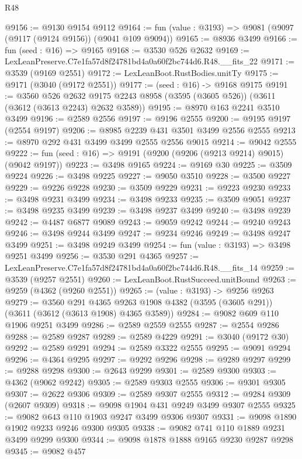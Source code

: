 \begin{lexlean}{R48}
\begin{coremodule}
@9156 := @9130 @9154 @9112
@9164 := fun (value : @3193) => @9081 (@9097 (@9117 (@9124 @9156)) (@9041 @109 @9094))
@9165 := @8936 @3499
@9166 := fun (seed : @16) => @9165
@9168 := @3530 @526 @2632
@9169 := LexLeanPreserve.C7e1fa57d8f24781bd4a0a60f2bc744d6.R48.__fits_22
@9171 := @3539 (@9169 @2551)
@9172 := LexLeanBoot.RustBodies.unitTy
@9175 := @9171 (@3040 (@9172 @2551))
@9177 := (seed : @16) -> @9168 @9175
@9191 := @3560
    @526
    @2632
    @9175
    @2243
    @8958
    (@3595 (@3605 @526))
    (@3611 (@3612 (@3613 @2243) @2632 @3589))
@9195 := @8970 @163 @2241 @3510 @3499
@9196 := @2589 @2556
@9197 := @9196 @2555
@9200 := @9195 @9197 (@2554 @9197)
@9206 := @8985 @2239 @431 @3501 @3499 @2556 @2555
@9213 := @8970 @292 @431 @3499 @3499 @2555 @2556 @9015
@9214 := @9042 @2555
@9222 := fun (seed : @16) => @9191 (@9200 (@9206 (@9213 @9214) @9015) (@9042 @9197))
@9223 := @3498 @9165
@9224 := @9169 @30
@9225 := @3509 @9224
@9226 := @3498 @9225
@9227 := @9050 @3510
@9228 := @3500 @9227
@9229 := @9226 @9228
@9230 := @3509 @9229
@9231 := @9223 @9230
@9233 := @3498 @9231 @3499
@9234 := @3498 @9233
@9235 := @3509 @9051
@9237 := @3498 @9235 @3499
@9239 := @3498 @9237 @3499
@9240 := @3498 @9239
@9242 := @4487 @6877 @9089
@9243 := @9059 @9242
@9244 := @9240 @9243
@9246 := @3498 @9244 @3499
@9247 := @9234 @9246
@9249 := @3498 @9247 @3499
@9251 := @3498 @9249 @3499
@9254 := fun (value : @3193) => @3498 @9251 @3499
@9256 := @3530 @291 @4365
@9257 := LexLeanPreserve.C7e1fa57d8f24781bd4a0a60f2bc744d6.R48.__fits_14
@9259 := @3539 (@9257 @2551)
@9260 := LexLeanBoot.RustSucceed.unitBound
@9263 := @9259 (@4362 (@9260 @2551))
@9265 := (value : @3193) -> @9256 @9263
@9279 := @3560
    @291
    @4365
    @9263
    @1908
    @4382
    (@3595 (@3605 @291))
    (@3611 (@3612 (@3613 @1908) @4365 @3589))
@9284 := @9082 @609 @110 @1906 @9251 @3499
@9286 := @2589 @2559 @2555
@9287 := @2554 @9286
@9288 := @2589 @9287
@9289 := @2589 @4229
@9291 := @3040 (@9172 @30)
@9292 := @2589 @9291
@9294 := @2589 @3322 @2555
@9295 := @9091 @9294
@9296 := @4364 @9295
@9297 := @9292 @9296
@9298 := @9289 @9297
@9299 := @9288 @9298
@9300 := @2643 @9299
@9301 := @2589 @9300
@9303 := @4362 (@9062 @9242)
@9305 := @2589 @9303 @2555
@9306 := @9301 @9305
@9307 := @2622 @9306
@9309 := @2589 @9307 @2555
@9312 := @9284 @9309 (@2607 @9309)
@9318 := @9098 @1904 @431 @9249 @3499 @9307 @2555
@9325 := @9082 @643 @110 @1903 @9247 @3499 @9306 @9307
@9331 := @9098 @1890 @1902 @9233 @9246 @9300 @9305
@9338 := @9082 @741 @110 @1889 @9231 @3499 @9299 @9300
@9344 := @9098 @1878 @1888 @9165 @9230 @9287 @9298
@9345 := @9082 @457

\end{coremodule}
\end{lexlean}
